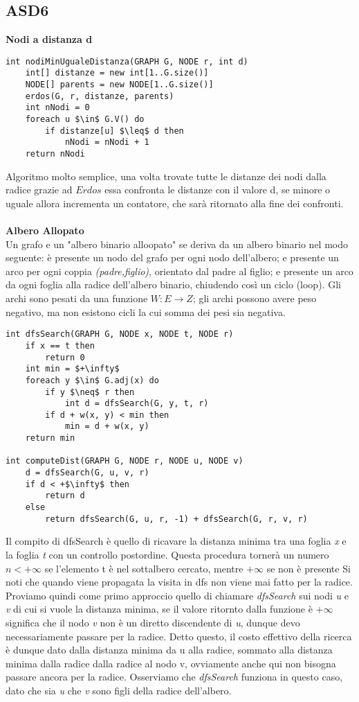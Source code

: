 \documentclass[../cheatSheetAlgoritmi.tex]{subfiles}
\begin{document}
\subsection{ASD6}
\textbf{Nodi a distanza d}
\begin{lstlisting}[caption= Nodi che distano un numero di archi $\leq$ d]
int nodiMinUgualeDistanza(GRAPH G, NODE r, int d)
	int[] distanze = new int[1..G.size()]
  	NODE[] parents = new NODE[1..G.size()]
  	erdos(G, r, distanze, parents)
  	int nNodi = 0
  	foreach u $\in$ G.V() do
    	if distanze[u] $\leq$ d then 
      		nNodi = nNodi + 1 
  	return nNodi
\end{lstlisting}
Algoritmo molto semplice, una volta trovate tutte le distanze dei nodi dalla radice grazie ad $Erdos$ essa confronta le distanze con il valore d, se minore o uguale allora incrementa un contatore, che sarà ritornato alla fine dei confronti.\\\\
\textbf{Albero Allopato}\\
Un grafo e un "albero binario alloopato" se
deriva da un albero binario nel modo seguente: è presente un nodo del
grafo per ogni nodo dell’albero; e presente un arco per ogni coppia
\textit{(padre,figlio)}, orientato dal padre al figlio; e presente un arco da ogni
foglia alla radice dell’albero binario, chiudendo così un ciclo (loop). Gli
archi sono pesati da una funzione $W : E\rightarrow Z$; gli archi possono avere
peso negativo, ma non esistono cicli la cui somma dei pesi sia negativa.
\begin{lstlisting}[caption= Albero Binario Allopato]
int dfsSearch(GRAPH G, NODE x, NODE t, NODE r)
	if x == t then
    	return 0
  	int min = $+\infty$ 
  	foreach y $\in$ G.adj(x) do
    	if y $\neq$ r then
      		int d = dfsSearch(G, y, t, r)
      	if d + w(x, y) < min then
        	min = d + w(x, y)
  	return min
 
int computeDist(GRAPH G, NODE r, NODE u, NODE v)
	d = dfsSearch(G, u, v, r)
  	if d < +$\infty$ then
    	return d
  	else
  		return dfsSearch(G, u, r, -1) + dfsSearch(G, r, v, r)
\end{lstlisting}
Il compito di dfsSearch è quello di ricavare la distanza minima tra una foglia \textit{x} e la foglia \textit{t} con un controllo postordine.
Questa procedura tornerà un numero $n < +\infty$ se l'elemento t è nel sottalbero cercato, mentre $+\infty$ se non è presente
Si noti che quando viene propagata la visita in dfs non viene mai fatto per la radice. \\
Proviamo quindi come primo approccio quello di chiamare \textit{dfsSearch} sui nodi \textit{u} e \textit{v} di cui si vuole la distanza minima, se il valore ritornto dalla funzione è $+\infty$ significa che il nodo \textit{v} non è un diretto discendente di \textit{u}, dunque devo necessariamente passare per la radice.
Detto questo, il costo effettivo della ricerca è dunque dato dalla distanza minima da u alla radice, sommato alla distanza minima dalla radice dalla radice al nodo v, ovviamente anche qui non bisogna passare ancora per la radice. Osserviamo che \textit{dfsSearch} funziona in questo caso, dato che sia \textit{u} che \textit{v} sono figli della radice dell'albero.
\end{document}
